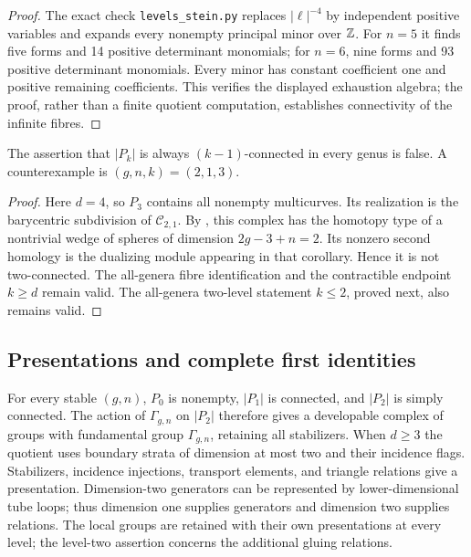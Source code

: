 \begin{proof}
The exact check \texttt{levels\_stein.py} replaces
\(|\ell|^{-4}\) by independent positive variables and expands
every nonempty principal minor over \(\mathbb Z\).
For \(n=5\) it finds five forms and 14 positive determinant
monomials; for \(n=6\), nine forms and 93 positive determinant
monomials. Every minor has constant coefficient one and positive
remaining coefficients. This verifies the displayed exhaustion
algebra; the proof, rather than a finite quotient computation,
establishes connectivity of the infinite fibres.
\end{proof}

\begin{proposition}\label{P5b4}
The assertion that \(|P_k|\) is always \((k-1)\)-connected in
every genus is false. A counterexample is \((g,n,k)=(2,1,3)\).
\end{proposition}

\begin{proof}
Here \(d=4\), so \(P_3\) contains all nonempty multicurves.
Its realization is the barycentric subdivision of
\(\mathcal C_{2,1}\). By
\citet[Chapter 4, Theorem 4.1 and Corollary 4.2]{Harer1988},
this complex has the homotopy type of a nontrivial wedge of
spheres of dimension \(2g-3+n=2\).
Its nonzero second homology is the dualizing module appearing
in that corollary. Hence it is not two-connected.
The all-genera fibre identification and the contractible
endpoint \(k\geq d\) remain valid. The all-genera two-level
statement \(k\leq2\), proved next, also remains valid.
\end{proof}

\subsection{Presentations and complete first identities}

\begin{theorem}
\label{P5c1}
For every stable \((g,n)\), \(P_0\) is nonempty, \(|P_1|\) is
connected, and \(|P_2|\) is simply connected.
The action of \(\Gamma_{g,n}\) on \(|P_2|\) therefore gives a
developable complex of groups with fundamental group
\(\Gamma_{g,n}\), retaining all stabilizers.
When \(d\geq3\) the quotient uses boundary strata of dimension
at most two and their incidence flags.
Stabilizers, incidence injections, transport elements, and
triangle relations give a presentation. Dimension-two
generators can be represented by lower-dimensional tube loops;
thus dimension one supplies generators and dimension two
supplies relations. The local groups are retained with their own
presentations at every level; the level-two assertion concerns the
additional gluing relations.
\end{theorem}

